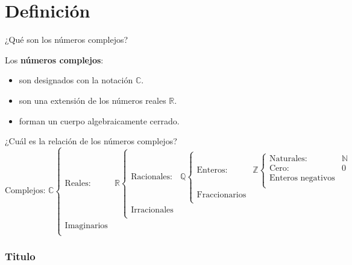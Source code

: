 
\section{Definición}

\begin{frame}[c]{¿Qué son los números complejos?}

  Los \textbf{números complejos}:

  \begin{itemize}
    \item son designados con la notación $\mathbb{C}$.
    \pausa
    \item son una extensión de los números reales $\mathbb{R}$.
    \pausa
    \item forman un cuerpo algebraicamente cerrado.
  \end{itemize}
\end{frame}

\begin{frame}[c]{¿Cuál es la relación de los números complejos?}
  \[
    \text{Complejos: }\mathbb{C} \begin{cases}
      \text{Reales:} & \mathbb{R} \begin{cases}
        \text{Racionales:} & \mathbb{Q} \begin{cases}
          \text{Enteros:} & \mathbb{Z} \begin{cases}
            \text{Naturales:} & \mathbb{N} \\
            \text{Cero:} & 0 \\
            \text{Enteros negativos} & \\
            \end{cases} \\
          \text{Fraccionarios} &  \\
          \end{cases} \\
        \text{Irracionales} &  \\
        \end{cases} \\
      \text{Imaginarios} & \\
    \end{cases}
  \]
\end{frame}

\begin{frame}[fragile]
  \frametitle{Titulo}

  \vspace{\baselineskip}
  \begin{lstlisting}[language=Python]
  \end{lstlisting}
\end{frame}
